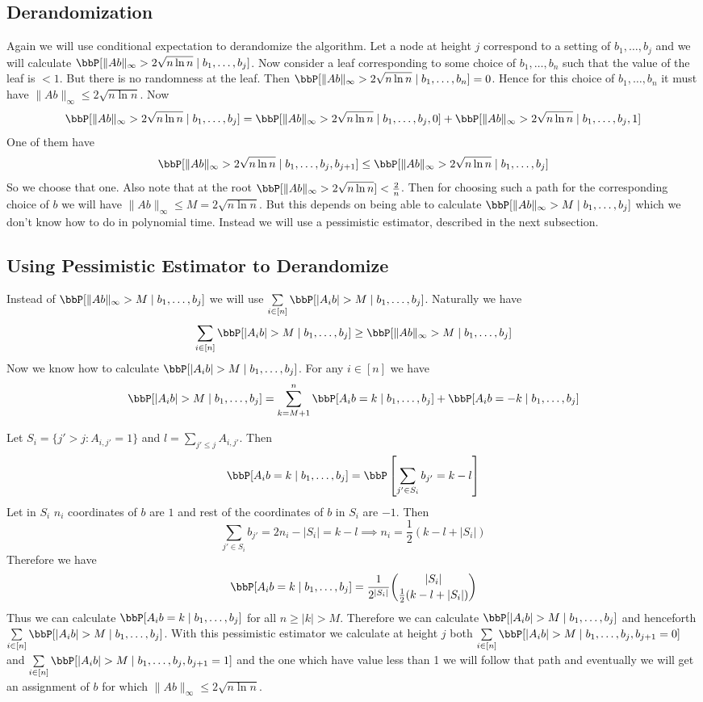 \subsection{Derandomization}
Again we will use conditional expectation to derandomize the algorithm. Let a node at height $j$ correspond to a setting of $b_1, \dots, b_j$ and we will calculate $\bbP[\|Ab\|_{\infty}>2\sqrt{n\ln n}\mid b_1,\dots, b_j]$. Now consider a leaf corresponding to some choice of $b_1,\dots, b_n$ such that the value of the leaf is $<1$.  But there is no randomness at the leaf. Then $\bbP[\|Ab\|_{\infty}>2\sqrt{n\ln n}\mid b_1,\dots, b_n]=0$. Hence for this choice of $b_1,\dots, b_n$ it must have $\|Ab\|_{\infty} \leq 2\sqrt{n\ln  n}$. Now $$\bbP[\|Ab\|_{\infty}>2\sqrt{n\ln n}\mid b_1,\dots, b_j]=\bbP[\|Ab\|_{\infty}>2\sqrt{n\ln n}\mid b_1,\dots, b_j,0]+\bbP[\|Ab\|_{\infty}>2\sqrt{n\ln n}\mid b_1,\dots, b_j,1]$$One of them have $$\bbP[\|Ab\|_{\infty}>2\sqrt{n\ln n}\mid b_1,\dots, b_j,b_{j+1}]\leq \bbP[\|Ab\|_{\infty}>2\sqrt{n\ln n}\mid b_1,\dots, b_j]$$So we choose that one. Also note that at the root $\bbP[\|Ab\|_{\infty}>2\sqrt{n\ln n}]<\frac2n$. Then for choosing such a path for the corresponding choice of $b$ we will have $\|Ab\|_{\infty}\leq M=2\sqrt{n\ln n}$. But this depends on being able to calculate $\bbP[\|Ab\|_{\infty}>M\mid b_1,\dots, b_j]$ which we don't know how to do in polynomial time. Instead we will use a pessimistic estimator, described in the next subsection.
\subsection{Using Pessimistic Estimator to Derandomize}
Instead of $\bbP[\|Ab\|_{\infty}>M\mid b_1,\dots, b_j]$ we will use $\sum\limits_{i\in [n]}\bbP[|A_ib|>M\mid b_1,\dots, b_j]$. Naturally we have $$\sum\limits_{i\in [n]}\bbP[|A_ib|>M\mid b_1,\dots, b_j]\geq \bbP[\|Ab\|_{\infty}>M\mid b_1,\dots, b_j]$$Now we know how to calculate $\bbP[|A_ib|>M\mid b_1,\dots, b_j]$. For any $i\in [n]$ we have $$\bbP[|A_ib|>M\mid b_1,\dots, b_j]=\sum_{k=M+1}^n \bbP[A_ib=k\mid b_1,\dots, b_j]+\bbP[A_ib=-k\mid b_1,\dots, b_j]$$

Let $S_i=\{j'>j\colon A_{i,j'}=1\}$ and $l=\sum\limits_{j'\leq j}A_{i,j'}$. Then $$ \bbP[A_ib=k\mid b_1,\dots, b_j]=  \bbP\lt[\sum\limits_{j'\in S_i}b_{j'}=k-l\rt]$$Let in $S_i$ $n_i$ coordinates of $b$ are $1$ and rest of the coordinates of $b$ in $S_i$ are $-1$. Then $$\sum_{j'\in S_i}b_{j'}=2n_i-|S_i|=k-l\implies n_i=\frac12(k-l+|S_i|)$$Therefore we have $$\bbP[A_ib=k\mid b_1,\dots, b_j]=\frac1{2^{|S_i|}}\binom{|S_i|}{\frac12(k-l+|S_i|)}$$Thus we can calculate $\bbP[A_ib=k\mid b_1,\dots, b_j]$ for all $n\geq |k|>M$. Therefore we can calculate $\bbP[|A_ib|>M\mid b_1,\dots, b_j]$ and henceforth $\sum\limits_{i\in [n]}\bbP[|A_ib|>M\mid b_1,\dots, b_j]$. With this pessimistic estimator we calculate at height $j$ both $\sum\limits_{i\in [n]}\bbP[|A_ib|>M\mid b_1,\dots, b_j,b_{j+1}=0] $ and $\sum\limits_{i\in [n]}\bbP[|A_ib|>M\mid b_1,\dots, b_j,b_{j+1}=1]$ and the one which have value less than 1 we will follow that path and eventually we will get an assignment of $b$ for which $\|Ab\|_{\infty}\leq 2\sqrt{n\ln n}$. 


